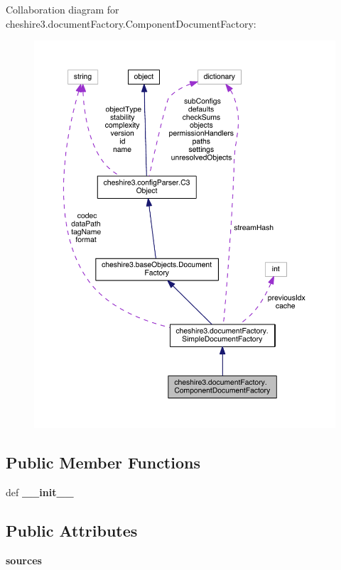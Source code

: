 Collaboration diagram for cheshire3.\-document\-Factory.\-Component\-Document\-Factory\-:
\nopagebreak
\begin{figure}[H]
\begin{center}
\leavevmode
\includegraphics[width=350pt]{classcheshire3_1_1document_factory_1_1_component_document_factory__coll__graph}
\end{center}
\end{figure}
\subsection*{Public Member Functions}
\begin{DoxyCompactItemize}
\item 
\hypertarget{classcheshire3_1_1document_factory_1_1_component_document_factory_ad756f53791829b68188bc9e61c186e91}{def {\bfseries \-\_\-\-\_\-init\-\_\-\-\_\-}}\label{classcheshire3_1_1document_factory_1_1_component_document_factory_ad756f53791829b68188bc9e61c186e91}

\end{DoxyCompactItemize}
\subsection*{Public Attributes}
\begin{DoxyCompactItemize}
\item 
\hypertarget{classcheshire3_1_1document_factory_1_1_component_document_factory_a84b44d4583642312ef6987b9b30397be}{{\bfseries sources}}\label{classcheshire3_1_1document_factory_1_1_component_document_factory_a84b44d4583642312ef6987b9b30397be}

\end{DoxyCompactItemize}
